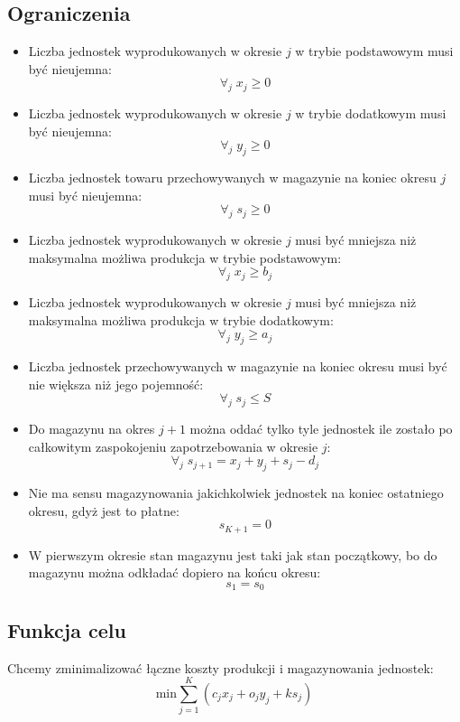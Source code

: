 \documentclass{article}
\begin{document}
\subsection{Ograniczenia}
\begin{itemize}
    \item Liczba jednostek wyprodukowanych w okresie $j$ w trybie podstawowym musi być nieujemna:
    \[\forall_{j} \; x_j \geq 0\]
    \item Liczba jednostek wyprodukowanych w okresie $j$ w trybie dodatkowym musi być nieujemna:
    \[\forall_{j} \; y_j \geq 0\]
    \item Liczba jednostek towaru przechowywanych w magazynie na koniec okresu $j$ musi być nieujemna:
    \[\forall_{j} \; s_j \geq 0\]
    \item Liczba jednostek wyprodukowanych w okresie $j$ musi być mniejsza niż maksymalna możliwa produkcja w trybie podstawowym:
    \[\forall_{j} \; x_j \geq b_j\]
    \item Liczba jednostek wyprodukowanych w okresie $j$ musi być mniejsza niż maksymalna możliwa produkcja w trybie dodatkowym:
    \[\forall_{j} \; y_j \geq a_j\]
    \item Liczba jednostek przechowywanych w magazynie na koniec okresu musi być nie większa niż jego pojemność:
    \[\forall_{j} \; s_j \leq S\]
    \item Do magazynu na okres $j+1$ można oddać tylko tyle jednostek ile zostało po całkowitym zaspokojeniu zapotrzebowania w okresie $j$:
    \[\forall_{j} \; s_{j+1} = x_j + y_j + s_j - d_j\]
    \item Nie ma sensu magazynowania jakichkolwiek jednostek na koniec ostatniego okresu, gdyż jest to płatne:
    \[s_{K+1} = 0\]
    \item W pierwszym okresie stan magazynu jest taki jak stan początkowy, bo do magazynu można odkładać dopiero na końcu okresu:
    \[s_1 = s_0\]
\end{itemize}
\subsection{Funkcja celu}
Chcemy zminimalizować łączne koszty produkcji i magazynowania jednostek:
\[\text{min} \sum_{j=1}^K (c_jx_j + o_jy_j + ks_j)\]
\end{document}
